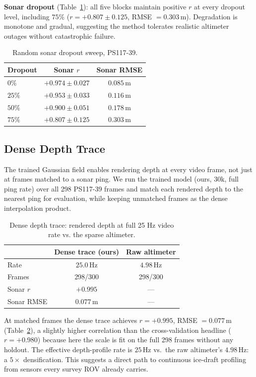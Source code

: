 \documentclass[conference]{IEEEtran}
\begin{document}
\textbf{Sonar dropout} (Table~\ref{tab:dropout}): all five blocks maintain
positive $r$ at every dropout level, including $75\%$ ($r=+0.807\pm0.125$,
RMSE $=0.303$\,m). Degradation is monotone and gradual, suggesting the
method tolerates realistic altimeter outages without catastrophic failure.

\begin{table}[t]
\centering
\caption{Random sonar dropout sweep, PS117-39.}
\label{tab:dropout}
\begin{tabular}{@{}lcc@{}}
\toprule
Dropout & Sonar $r$ & Sonar RMSE \\
\midrule
$0\%$ & $+0.974\pm0.027$ & $0.085$\,m \\
$25\%$ & $+0.953\pm0.033$ & $0.116$\,m \\
$50\%$ & $+0.900\pm0.051$ & $0.178$\,m \\
$75\%$ & $+0.807\pm0.125$ & $0.303$\,m \\
\bottomrule
\end{tabular}
\end{table}

\subsection{Dense Depth Trace}
\label{sec:dense-trace}

The trained Gaussian field enables rendering depth at every video frame, not just at frames matched to a sonar ping. We run the trained model (ours, 30k, full ping rate) over all 298 PS117-39 frames and match each rendered depth to the nearest ping for evaluation, while keeping unmatched frames as the dense interpolation product.

\begin{table}[t]
\centering
\caption{Dense depth trace: rendered depth at full 25 Hz video rate vs. the sparse altimeter.}
\label{tab:dense}
\begin{tabular}{@{}lcc@{}}
\toprule
 & Dense trace (ours) & Raw altimeter \\
\midrule
Rate & $25.0$\,Hz & $4.98$\,Hz \\
Frames & 298/300 & 298/300 \\
Sonar $r$ & $+0.995$ & --- \\
Sonar RMSE & $0.077$\,m & --- \\
\bottomrule
\end{tabular}
\end{table}

At matched frames the dense trace achieves $r = +0.995$, RMSE $= 0.077$\,m (Table~\ref{tab:dense}), a slightly higher correlation than the cross-validation headline ($r = +0.980$) because here the scale is fit on the full 298 frames without any holdout. The effective depth-profile rate is $25$\,Hz vs.\ the raw altimeter's $4.98$\,Hz: a $5\times$ densification. This suggests a direct path to continuous ice-draft profiling from sensors every survey ROV already carries.
\end{document}

